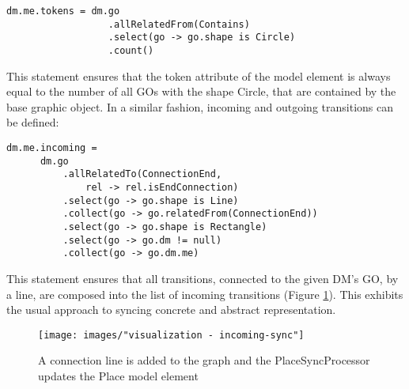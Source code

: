 \begin{lstlisting}[captionpos=b,caption={Rule that syncs the token count of a place element}]
dm.me.tokens = dm.go
                  .allRelatedFrom(Contains)
                  .select(go -> go.shape is Circle)
                  .count()
\end{lstlisting}

This statement ensures that the token attribute of the model element is always equal to the number of all GOs with the shape Circle, that are contained by the base graphic object. In a similar fashion, incoming and outgoing transitions can be defined:
\begin{lstlisting}[captionpos=b,caption={Rule that syncs incoming transitions of a place element},label={lst:incoming-transitions}]
dm.me.incoming = 
      dm.go
          .allRelatedTo(ConnectionEnd,
              rel -> rel.isEndConnection)
          .select(go -> go.shape is Line)
          .collect(go -> go.relatedFrom(ConnectionEnd))
          .select(go -> go.shape is Rectangle)
          .select(go -> go.dm != null)
          .collect(go -> go.dm.me)
\end{lstlisting}

This statement ensures that all transitions, connected to the given DM's GO, by a line, are composed into the list of incoming transitions (Figure \ref{fig:incoming-sync}). This exhibits the usual approach to syncing concrete and abstract representation.


\begin{figure}
  \centering
  \texttt{[image: images/"visualization - incoming-sync"]}
  \caption{A connection line is added to the graph and the PlaceSyncProcessor updates the Place model element}
  \label{fig:incoming-sync}
\end{figure}

